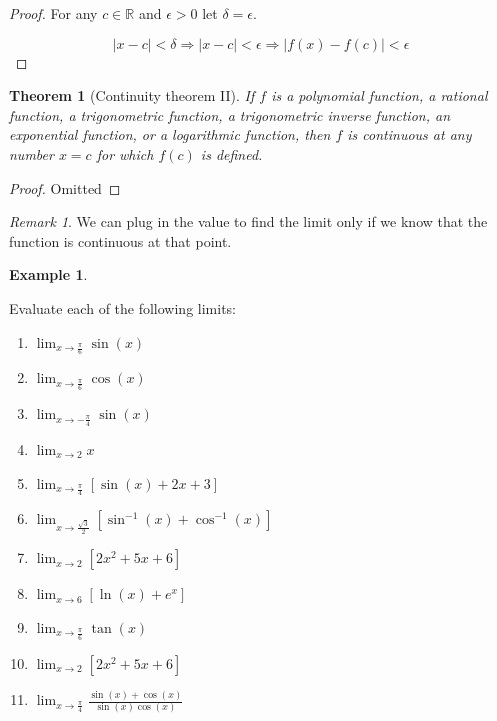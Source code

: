 \documentclass[
]{book}
\providecommand{\tightlist}{%
  \setlength{\itemsep}{0pt}\setlength{\parskip}{0pt}}
\newtheorem{theorem}{Theorem}[chapter]
\theoremstyle{definition}
\theoremstyle{definition}
\newtheorem{example}{Example}[chapter]
\theoremstyle{definition}
\theoremstyle{definition}
\theoremstyle{remark}
\newtheorem*{remark}{Remark}
\begin{document}
\begin{proof}
For any \(c \in \mathbb{R}\) and \(\epsilon > 0\) let
\(\delta = \epsilon\).

\[|x - c| < \delta \Rightarrow |x - c| < \epsilon \Rightarrow |f(x) - f(c)| < \epsilon\]
\end{proof}

\begin{theorem}[Continuity theorem II]
\protect\hypertarget{thm:unnamed-chunk-25}{}\label{thm:unnamed-chunk-25}If \(f\) is a polynomial function, a rational function, a trigonometric
function, a trigonometric inverse function, an exponential function, or
a logarithmic function, then \(f\) is continuous at any number \(x = c\) for which \(f(c)\) is defined.
\end{theorem}

\begin{proof}
Omitted
\end{proof}

\begin{remark}
We can plug in the value to find the limit only if we
know that the function is continuous at that point.
\end{remark}

\begin{example}
\protect\hypertarget{exm:unnamed-chunk-28}{}\label{exm:unnamed-chunk-28}

Evaluate each of the following limits:

\begin{enumerate}
\def\labelenumi{\roman{enumi})}
\tightlist
\item
  \(\lim_{{x \to \frac{\pi}{6}}} \sin(x)\)
\item
  \(\lim_{{x \to \frac{\pi}{6}}} \cos(x)\)
\item
  \(\lim_{{x \to -\frac{\pi}{4}}} \sin(x)\)
\item
  \(\lim_{{x \to 2}} x\)
\item
  \(\lim_{{x \to \frac{\pi}{4}}} [\sin(x) + 2x + 3]\)
\item
  \(\lim_{{x \to \frac{\sqrt{3}}{2}}} [\sin^{-1}(x) + \cos^{-1}(x)]\)
\item
  \(\lim_{{x \to 2}} [2x^2 + 5x + 6]\)
\item
  \(\lim_{{x \to 6}} [\ln(x) + e^x]\)
\item
  \(\lim_{{x \to \frac{\pi}{6}}} \tan(x)\)
\item
  \(\lim_{{x \to 2}} [2x^2 + 5x + 6]\)
\item
  \(\lim_{{x \to \frac{\pi}{4}}} \frac{\sin(x) + \cos(x)}{\sin(x) \cos(x)}\)
\end{enumerate}

\end{example}
\end{document}
